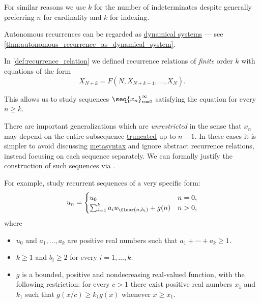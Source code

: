 \begin{comments}
  For similar reasons we use \( k \) for the number of indeterminates despite generally preferring \( n \) for cardinality and \( k \) for indexing.

  \item Autonomous recurrences can be regarded as \hyperref[def:dynamical_system]{dynamical systems} --- see \cref{thm:autonomous_recurrence_as_dynamical_system}.
\end{comments}

\begin{remark}\label{rem:unrestricted_recurrence_relation}
  In \cref{def:recurrence_relation} we defined recurrence relations of \emph{finite} order \( k \) with equations of the form
  \begin{equation*}
    X_{N+k} = F(N, X_{N+k-1}, \ldots, X_N).
  \end{equation*}

  This allows us to study sequences \( \seq{ x_n }_{n=0}^\infty \) satisfying the equation for every \( n \geq k \).

  There are important generalizations which are \emph{unrestricted} in the sense that \( x_n \) may depend on the entire subsequence \hyperref[def:truncated_sequence]{truncated} up to \( n - 1 \). In these cases it is simpler to avoid discussing \hyperref[con:metalanguage]{metasyntax} and ignore abstract recurrence relations, instead focusing on each sequence separately. We can formally justify the construction of such sequences via .

  For example, \textcite{AkraBazzi1998Recurrences} study recurrent sequences of a very specific form:
  \begin{equation*}
    u_n = \begin{cases}
      u_0                                        &n = 0, \\
      \sum_{i=1}^k a_i u_{\floor(n, b_i)} + g(n) &n > 0,
    \end{cases}
  \end{equation*}
  where
  \begin{itemize}
    \item \( u_0 \) and \( a_1, \ldots, a_k \) are positive real numbers such that \( a_1 + \cdots + a_k \geq 1 \).
    \item \( k \geq 1 \) and \( b_i \geq 2 \) for every \( i = 1, \ldots, k \).
    \item \( g \) is a bounded, positive and nondecreasing real-valued function, with the following restriction: for every \( c > 1 \) there exist positive real numbers \( x_1 \) and \( k_1 \) such that \( g(x / c) \geq k_1 g(x) \) whenever \( x \geq x_1 \).
  \end{itemize}
\end{remark}

